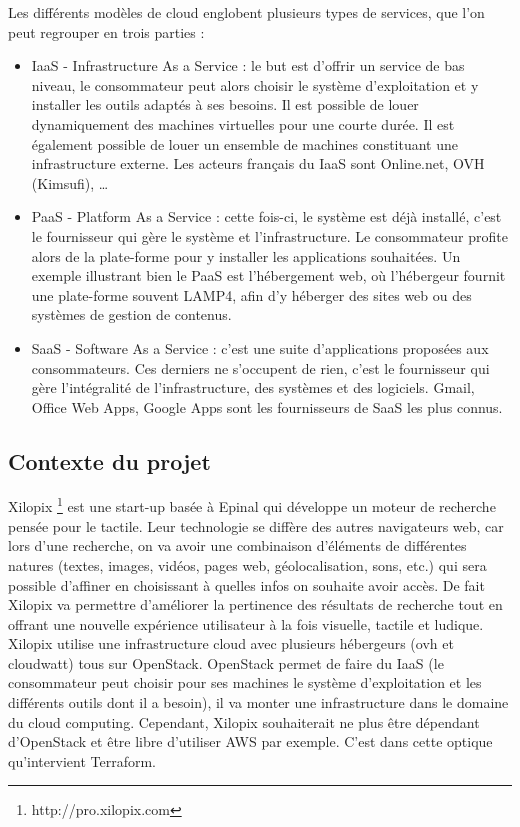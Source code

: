 \documentclass[]{article}
\begin{document}
Les différents modèles de cloud englobent plusieurs types de services,
que l'on peut regrouper en trois parties : 
\begin{itemize}
\item IaaS - Infrastructure As a
Service : le but est d'offrir un service de bas niveau, le consommateur
peut alors choisir le système d'exploitation et y installer les outils
adaptés à ses besoins. Il est possible de louer dynamiquement des
machines virtuelles pour une courte durée. Il est également possible de
louer un ensemble de machines constituant une infrastructure externe.
Les acteurs français du IaaS sont Online.net, OVH (Kimsufi), \ldots{} 
\item PaaS - Platform As a Service : cette fois-ci, le système est déjà
installé, c'est le fournisseur qui gère le système et l'infrastructure.
Le consommateur profite alors de la plate-forme pour y installer les
applications souhaitées. Un exemple illustrant bien le PaaS est
l'hébergement web, où l'hébergeur fournit une plate-forme souvent LAMP4,
afin d'y héberger des sites web ou des systèmes de gestion de contenus.
\item SaaS - Software As a Service : c'est une suite d'applications
proposées aux consommateurs. Ces derniers ne s'occupent de rien, c'est
le fournisseur qui gère l'intégralité de l'infrastructure, des systèmes
et des logiciels. Gmail, Office Web Apps, Google Apps sont les
fournisseurs de SaaS les plus connus.
\end{itemize}

\subsection{Contexte du projet}\label{contexte-du-projet}

Xilopix \footnote{http://pro.xilopix.com} est une start-up basée à Epinal qui
développe un moteur de recherche pensée pour le tactile. Leur
technologie se diffère des autres navigateurs web, car lors d'une
recherche, on va avoir une combinaison d'éléments de différentes natures
(textes, images, vidéos, pages web, géolocalisation, sons, etc.) qui
sera possible d'affiner en choisissant à quelles infos on souhaite avoir
accès. De fait Xilopix va permettre d'améliorer la pertinence des
résultats de recherche tout en offrant une nouvelle expérience
utilisateur à la fois visuelle, tactile et ludique. Xilopix utilise une
infrastructure cloud avec plusieurs hébergeurs (ovh et cloudwatt) tous
sur OpenStack. OpenStack permet de faire du IaaS (le consommateur peut
choisir pour ses machines le système d'exploitation et les différents
outils dont il a besoin), il va monter une infrastructure dans le
domaine du cloud computing. Cependant, Xilopix souhaiterait ne plus être
dépendant d'OpenStack et être libre d'utiliser AWS par exemple. C'est
dans cette optique qu'intervient Terraform.
\end{document}
